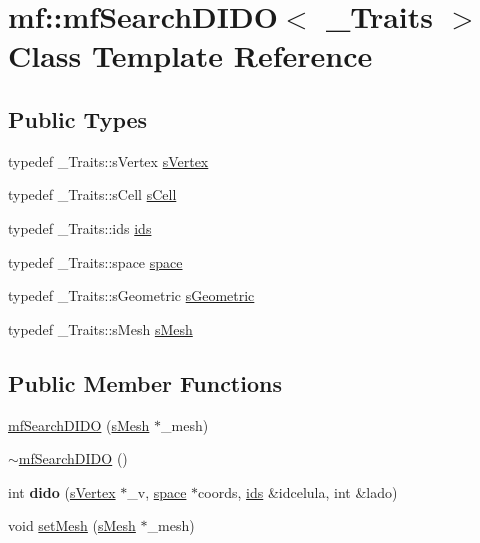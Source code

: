 \hypertarget{classmf_1_1mfSearchDIDO}{
\section{mf::mfSearchDIDO$<$ \_\-Traits $>$ Class Template Reference}
\label{classmf_1_1mfSearchDIDO}
}
\subsection*{Public Types}
\begin{DoxyCompactItemize}
\item 
typedef \_\-Traits::sVertex \hyperlink{classmf_1_1mfSearchDIDO_ad6074a0d2b1cdc485e8e2f80e6919156}{sVertex}
\item 
typedef \_\-Traits::sCell \hyperlink{classmf_1_1mfSearchDIDO_a1dcd18812432c1b5bd738f1f1a9eaf5a}{sCell}
\item 
typedef \_\-Traits::ids \hyperlink{classmf_1_1mfSearchDIDO_a01104ce1f89f6f20c744a1b0f986a312}{ids}
\item 
typedef \_\-Traits::space \hyperlink{classmf_1_1mfSearchDIDO_a47bbf10b71c54f3e87032850c8cfe217}{space}
\item 
typedef \_\-Traits::sGeometric \hyperlink{classmf_1_1mfSearchDIDO_ad8d6f59a3f5c291249ea4e7905b543a1}{sGeometric}
\item 
typedef \_\-Traits::sMesh \hyperlink{classmf_1_1mfSearchDIDO_af73c732f3c0a7fe85765bb4c49bd5545}{sMesh}
\end{DoxyCompactItemize}
\subsection*{Public Member Functions}
\begin{DoxyCompactItemize}
\item 
\hyperlink{classmf_1_1mfSearchDIDO_a753f67ea994ce478a602d6b7eac3c537}{mfSearchDIDO} (\hyperlink{classmf_1_1mfSearchDIDO_af73c732f3c0a7fe85765bb4c49bd5545}{sMesh} $\ast$\_\-mesh)
\item 
\hyperlink{classmf_1_1mfSearchDIDO_adc4cffff1004acf0f73a06e64c22b9e4}{$\sim$mfSearchDIDO} ()
\item 
\hypertarget{classmf_1_1mfSearchDIDO_ac911d0b101d98ddfc5d2e078d9bfaed6}{
int {\bfseries dido} (\hyperlink{classmf_1_1mfSearchDIDO_ad6074a0d2b1cdc485e8e2f80e6919156}{sVertex} $\ast$\_\-v, \hyperlink{classmf_1_1mfSearchDIDO_a47bbf10b71c54f3e87032850c8cfe217}{space} $\ast$coords, \hyperlink{classmf_1_1mfSearchDIDO_a01104ce1f89f6f20c744a1b0f986a312}{ids} \&idcelula, int \&lado)}
\label{classmf_1_1mfSearchDIDO_ac911d0b101d98ddfc5d2e078d9bfaed6}

\item 
void \hyperlink{classmf_1_1mfSearchDIDO_a855c47d8485ef2285bdb168d30685b70}{setMesh} (\hyperlink{classmf_1_1mfSearchDIDO_af73c732f3c0a7fe85765bb4c49bd5545}{sMesh} $\ast$\_\-mesh)
\end{DoxyCompactItemize}
